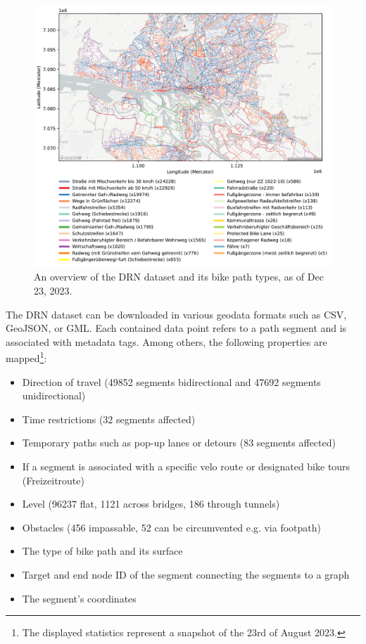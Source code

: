 \begin{figure}[htbp]
\centering
\includegraphics[width=\linewidth]{images/routing-drn.pdf}
\caption{An overview of the DRN dataset and its bike path types, as of Dec 23, 2023.}
\label{fig:drn-map}
\end{figure}

The DRN dataset can be downloaded in various geodata formats such as CSV, GeoJSON, or GML. Each contained data point refers to a path segment and is associated with metadata tags. Among others, the following properties are mapped\footnote{The displayed statistics represent a snapshot of the 23rd of August 2023.}:

\begin{itemize}
    \item Direction of travel (49852 segments bidirectional and 47692 segments unidirectional)
    \item Time restrictions (32 segments affected)
    \item Temporary paths such as pop-up lanes or detours (83 segments affected)
    \item If a segment is associated with a specific velo route or designated bike tours (Freizeitroute)
    \item Level (96237 flat, 1121 across bridges, 186 through tunnels)
    \item Obstacles (456 impassable, 52 can be circumvented e.g. via footpath)
    \item The type of bike path and its surface
    \item Target and end node ID of the segment connecting the segments to a graph
    \item The segment's coordinates
\end{itemize}

